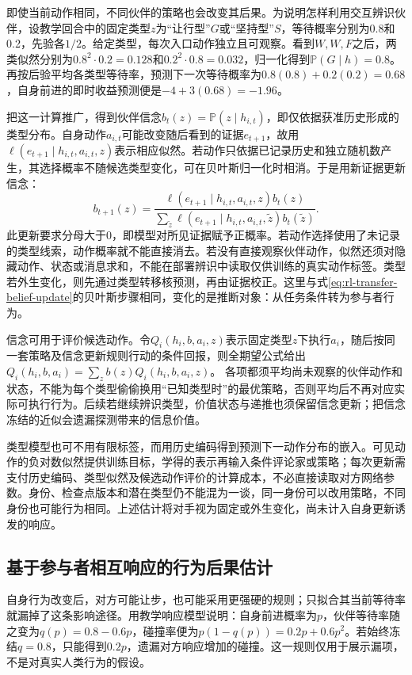 即使当前动作相同，不同伙伴的策略也会改变其后果。为说明怎样利用交互辨识伙伴，设教学回合中的固定类型$z$为“让行型”$G$或“坚持型”$S$，等待概率分别为0.8和0.2，先验各$1/2$。给定类型，每次入口动作独立且可观察。看到$W,W,F$之后，两类似然分别为$0.8^2\cdot0.2=0.128$和$0.2^2\cdot0.8=0.032$，归一化得到$\mathbb P(G\mid h)=0.8$。再按后验平均各类型等待率，预测下一次等待概率为$0.8(0.8)+0.2(0.2)=0.68$，自身前进的即时收益预测便是$-4+3(0.68)=-1.96$。

把这一计算推广，得到伙伴信念$b_t(z)=\mathbb P(z\mid h_{i,t})$，即仅依据获准历史形成的类型分布。自身动作$a_{i,t}$可能改变随后看到的证据$e_{t+1}$，故用$\ell(e_{t+1}\mid h_{i,t},a_{i,t},z)$表示相应似然。若动作只依据已记录历史和独立随机数产生，其选择概率不随候选类型变化，可在贝叶斯归一化时相消。于是用新证据更新信念：
\[
 b_{t+1}(z)=
 \frac{\ell(e_{t+1}\mid h_{i,t},a_{i,t},z)b_t(z)}
      {\sum_{\tilde z}\ell(e_{t+1}\mid h_{i,t},a_{i,t},\tilde z)b_t(\tilde z)}.
\]
此更新要求分母大于0，即模型对所见证据赋予正概率。若动作选择使用了未记录的类型线索，动作概率就不能直接消去。若没有直接观察伙伴动作，似然还须对隐藏动作、状态或消息求和，不能在部署辨识中读取仅供训练的真实动作标签。类型若外生变化，则先通过类型转移核预测，再由证据校正。这里与式\eqref{eq:rl-transfer-belief-update}的贝叶斯步骤相同，变化的是推断对象：从任务条件转为参与者行为。

信念可用于评价候选动作。令$Q_i(h_i,b,a_i,z)$表示固定类型$z$下执行$a_i$，随后按同一套策略及信念更新规则行动的条件回报，则全期望公式给出
$Q_i(h_i,b,a_i)=\sum_z b(z)Q_i(h_i,b,a_i,z)$。
各项都须平均尚未观察的伙伴动作和状态，不能为每个类型偷偷换用“已知类型时”的最优策略，否则平均后不再对应实际可执行行为。后续若继续辨识类型，价值状态与递推也须保留信念更新；把信念冻结的近似会遗漏探测带来的信息价值。

类型模型也可不用有限标签，而用历史编码得到预测下一动作分布的嵌入。可见动作的负对数似然提供训练目标，学得的表示再输入条件评论家或策略；每次更新需支付历史编码、类型似然及候选动作评价的计算成本，不必直接读取对方网络参数。身份、检查点版本和潜在类型仍不能混为一谈，同一身份可以改用策略，不同身份也可能行为相同。上述估计将对手视为固定或外生变化，尚未计入自身更新诱发的响应。

\subsection{基于参与者相互响应的行为后果估计}
\label{sec:rl-multi-agent-response-model}

自身行为改变后，对方可能让步，也可能采用更强硬的规则；只拟合其当前等待率就漏掉了这条影响途径。用教学响应模型说明：自身前进概率为$p$，伙伴等待率随之变为$q(p)=0.8-0.6p$，碰撞率便为$p(1-q(p))=0.2p+0.6p^2$。若始终冻结$q=0.8$，只能得到$0.2p$，遗漏对方响应增加的碰撞。这一规则仅用于展示漏项，不是对真实人类行为的假设。

